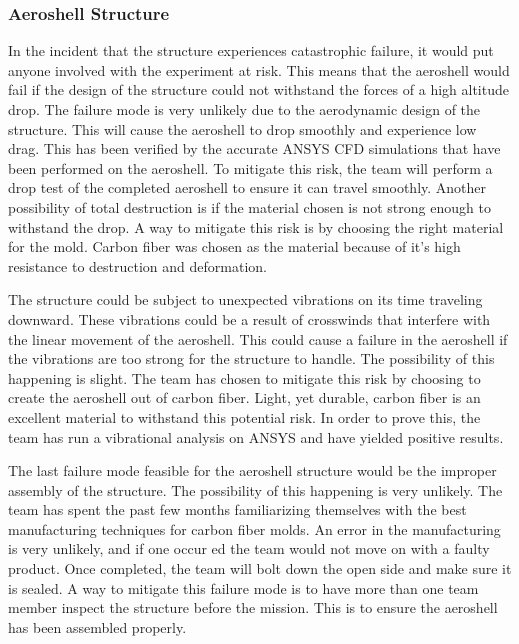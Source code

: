 \subsubsection*{Aeroshell Structure}
\indent\indent In the incident that the structure experiences catastrophic failure, it would put anyone involved with the experiment at risk. This means that the aeroshell would fail if the design of the structure could not withstand the forces of a high altitude drop. The failure mode is very unlikely due to the aerodynamic design of the structure. This will cause the aeroshell to drop smoothly and experience low drag. This has been verified by the accurate ANSYS CFD simulations that have been performed on the aeroshell. To mitigate this risk, the team will perform a drop test of the completed aeroshell to ensure it can travel smoothly. Another possibility of total destruction is if the material chosen is not strong enough to withstand the drop. A way to mitigate this risk is by choosing the right material for the mold. Carbon fiber was chosen as the material because of it's high resistance to destruction and deformation.

The structure could be subject to unexpected vibrations on its time traveling downward. These vibrations could be a result of crosswinds that interfere with the linear movement of the aeroshell. This could cause a failure in the aeroshell if the vibrations are too strong for the structure to handle. The possibility of this happening is slight. The team has chosen to mitigate this risk by choosing to create the aeroshell out of carbon fiber. Light, yet durable, carbon fiber is an excellent material to withstand this potential risk. In order to prove this, the team has run a vibrational analysis on ANSYS and have yielded positive results.

The last failure mode feasible for the aeroshell structure would be the improper assembly of the structure. The possibility of this happening is very unlikely. The team has spent the past few months familiarizing themselves with the best manufacturing techniques for carbon fiber molds. An error in the manufacturing is very unlikely, and if one occur ed the team would not move on with a faulty product. Once completed, the team will bolt down the open side and make sure it is sealed. A way to mitigate this failure mode is to have more than one team member inspect the structure before the mission. This is to ensure the aeroshell has been assembled properly.

